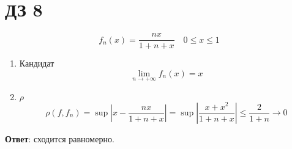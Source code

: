 

\cfoot{}
\rfoot{}



\section*{ДЗ 8}

\begin{exercise}[2750]
    \[f_n(x) = \frac{nx}{1 + n + x} \quad 0 \leq x \leq 1\]

    \begin{enumerate}
        \item Кандидат
              \[\lim_{n\to +\infty} f_n(x) = x\]
        \item \(\rho\)
              \[\rho(f, f_n) = \sup |x - \frac{nx}{1 + n + x}| = \sup \left|\frac{x + x^2}{1 + n + x}\right| \leq \frac{2}{1 + n} \to 0\]
    \end{enumerate}

    \textbf{Ответ}: сходится равномерно.
\end{exercise}

